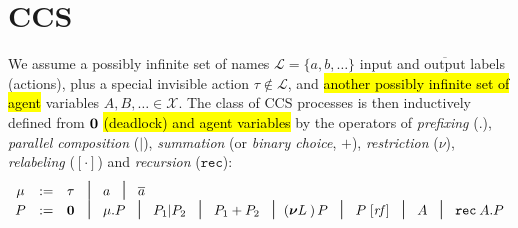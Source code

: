 
\section{CCS}
\label{ss:ccs}

We assume a possibly infinite set of names $\mathscr{L} = \{a, b,
\ldots\}$  input and $\overline{\mbox{output}}$ labels (actions), plus a special invisible
action $\tau \notin \mathscr{L}$, and \hl{another possibly infinite
  set of agent} variables $A, B,
\ldots \in \mathscr{X}$.
The class of CCS processes is then inductively
defined from ${\boldsymbol 0}$ \hl{(deadlock) and agent variables} by the operators
of \emph{prefixing} (.), \emph{parallel composition} ($|$),
\emph{summation}
(or \emph{binary choice}, $+$),
\emph{restriction} ($\nu$), \emph{relabeling} ($[\cdot]$) and
\emph{recursion} ($\texttt{rec}$):
\begin{equation*}
\begin{array}{cccl}
\mu  & := & \tau\!\!\!\! & \midd \; a  \; \midd \;  \outC a  \\
P  & := & \nil\!\!\!\! & \midd \;  \mu . P \; \midd \;  P_1 |  P_2 \; \midd  \;
P_1 + P_2 \; \midd 
(\res L)\, P
\; \midd \; P\; [\mathit{rf}]  %
\;  \midd \;  A \; \midd \; \recu A  P
\end{array}
\end{equation*}
